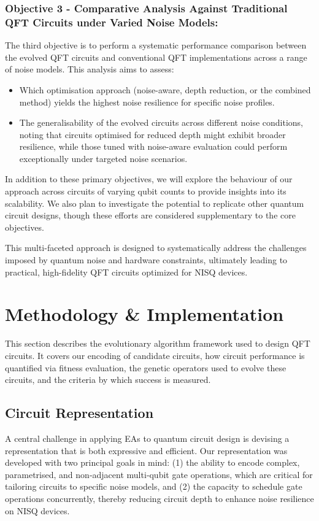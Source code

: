 \documentclass[11pt,a4paper]{article}
\begin{document}
\subsubsection*{Objective 3 - Comparative Analysis Against Traditional QFT Circuits under Varied Noise Models:}
The third objective is to perform a systematic performance comparison between the evolved QFT circuits and conventional QFT implementations across a range of noise models. This analysis aims to assess:
\begin{itemize}
    \item Which optimisation approach (noise-aware, depth reduction, or the combined method) yields the highest noise resilience for specific noise profiles.
    \item The generalisability of the evolved circuits across different noise conditions, noting that circuits optimised for reduced depth might exhibit broader resilience, while those tuned with noise-aware evaluation could perform exceptionally under targeted noise scenarios.
\end{itemize}

In addition to these primary objectives, we will explore the behaviour of our approach across circuits of varying qubit counts to provide insights into its scalability. We also plan to investigate the potential to replicate other quantum circuit designs, though these efforts are considered supplementary to the core objectives.\newline

This multi-faceted approach is designed to systematically address the challenges imposed by quantum noise and hardware constraints, ultimately leading to practical, high-fidelity QFT circuits optimized for NISQ devices.

%
%
\section{Methodology \& Implementation}

This section describes the evolutionary algorithm framework used to design QFT circuits. It covers our encoding of candidate circuits, how circuit performance is quantified via fitness evaluation, the genetic operators used to evolve these circuits, and the criteria by which success is measured.

\subsection{Circuit Representation}
A central challenge in applying EAs to quantum circuit design is devising a representation that is both expressive and efficient. Our representation was developed with two principal goals in mind: (1) the ability to encode complex, parametrised, and non‐adjacent multi‐qubit gate operations, which are critical for tailoring circuits to specific noise models, and (2) the capacity to schedule gate operations concurrently, thereby reducing circuit depth to enhance noise resilience on NISQ devices.\newline
\end{document}
